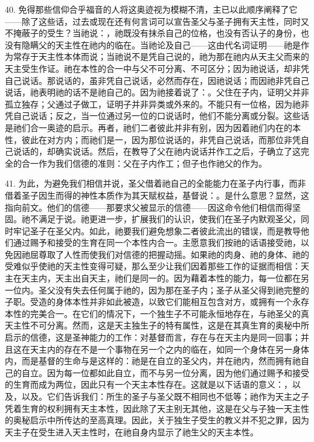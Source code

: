 40. 免得那些信仰合乎福音的人将这奥迹视为模糊不清，主已以此顺序阐释了它——除了这些话，过去或现在还有何言词可以宣告圣父与圣子拥有天主性，同时又不掩蔽子的受生？当祂说：，祂既没有抹杀自己的位格，也没有否认子的身份，也没有隐瞒父的天主性在祂内的临在。当祂论及自己——这由代名词证明——祂是作为常存于天主性本体而说；当祂说不是凭自己说的，祂为那在祂内从天主父而来的天主受生作证。祂在本性的合一中与父不可分离、不可区分；因为祂说话，却非凭自己说话。那说话的，虽非凭自己说话，必然而存在，因祂说话；而因祂非凭自己说话，祂表明祂的话不是祂自己的。因为祂接着说了：。父住在子内，证明父并非孤立独存；父通过子做工，证明子并非异类或外来的。不能只有一位格，因为祂非凭自己说话；反之，当一位通过另一位的口说话时，他们不能分离或分裂。这些话是祂们合一奥迹的启示。再者，祂们二者彼此并非有别，因为因着祂们内在的本性，彼此在对方内；而祂们是一，因为那位说话的，非凭自己说话，而那位非凭自己说话的，却确实说话。然后，在教导了父在祂内说话并作工之后，子确立了这完全的合一作为我们信德的准则：父在子内作工；但子也作祂父的作为。\par

41. 为此，为避免我们相信并说，圣父借着祂自己的全能能力在圣子内行事，而非借着圣子因生而得的神性本质作为其天赋权益，基督说：。是什么意思？显然，这指向前文。他们的信德——那要求父被显示的信德——因这命令他们相信而得坚固。祂不满足于说。祂更进一步，扩展我们的认识，使我们在圣子内默观圣父，同时牢记圣子在圣父内。如此，祂要我们避免想象二者彼此流出的错误，而是教导他们通过赐予和接受的生育在同一个本性内合一。主愿意我们按祂的话语接受祂，以免因祂屈尊取了人性而使我们对信德的把握动摇。如果祂的肉身、祂的身体、祂的受难似乎使祂的天主性变得可疑，那么至少让我们因着那些工作的证据而相信：天主在天主内，天主出自天主，祂们是同一的。因为藉着本性的能力，每一位都在另一位内。圣父没有失去任何属于祂的，因为那在圣子内；圣子从圣父得到祂完整的子职。受造的身体本性并非如此被造，以致它们能相互包含对方，或拥有一个永存本性的完美合一。在它们的情况下，一个独生子不可能永恒地存在，与祂圣父的真天主性不可分离。然而，这是天主独生子的特有属性，这是在其真生育的奥秘中所启示的信德，这是圣神能力的工作：对基督而言，存在与在天主内是同一回事；并且这在天主内的存在不是一个事物在另一个之内的临在，如同一个身体在另一身体内，而是基督的生命与是这样的：祂是在自立的圣父内，并在祂内，然而拥有祂自己的自立。因为每一位都如此自立，而不与另一位分离，因为他们通过赐予和接受的生育而成为两位，因此只有一个天主本性存在。这就是以下话语的意义：，以及，以及。它们告诉我们：所生的圣子与圣父既不相同也不低等；祂作为天主之子凭着生育的权利拥有天主本性，因此除了天主别无其他，这是在父与子独一天主性的奥秘启示中所传达的至高真理。因此，关于独生子受生的教义并不犯之罪，因为天主子在受生进入天主性时，在祂自身内显示了祂生父的天主本性。\par

